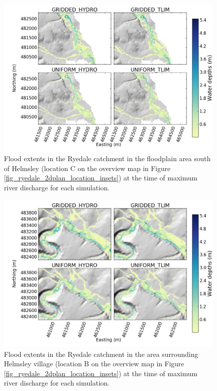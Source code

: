 \begin{figure}
\includegraphics[width=20cm]{chp_flood_figs_scripts/fig_ryedale_flood_ensemble_floodplain.png}
\caption{Flood extents in the Ryedale catchment in the floodplain area south of Helmsley (location C on the overview map in Figure \ref{fig_ryedale_2dplan_location_insets}) at the time of maximum river discharge for each simulation.}
\label{fig_ryedale_2dplan_flood_ensemble_floodplain}
\end{figure}

\begin{figure}
\includegraphics[width=20cm]{chp_flood_figs_scripts/fig_ryedale_flood_ensemble_helmsely.png}
\caption{Flood extents in the Ryedale catchment in the area surrounding Helmsley village (location B on the overview map in Figure \ref{fig_ryedale_2dplan_location_insets}) at the time of maximum river discharge for each simulation.}
\label{fig_ryedale_2dplan_flood_ensemble_town}
\end{figure}

